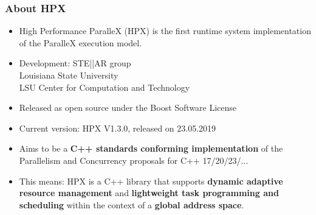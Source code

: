 
\begin{frame}
\frametitle{About HPX}
\begin{itemize}
  \item High Performance ParalleX (HPX) is the first runtime system implementation of the ParalleX execution model.
  \item Development: STE||AR group \\ Louisiana State University \\ LSU Center for Computation and Technology
  \item Released as open source under the Boost Software License
  \item Current version: HPX V1.3.0, released on 23.05.2019
  \item Aims to be a \textbf{C++ standards conforming implementation} of the Parallelism and Concurrency proposals for C++ 17/20/23/...
  \item This means: HPX is a C++ library that supports \textbf{dynamic adaptive resource management} and \textbf{lightweight task programming and scheduling} within the context of a \textbf{global address space}. 
\end{itemize}
\end{frame}

